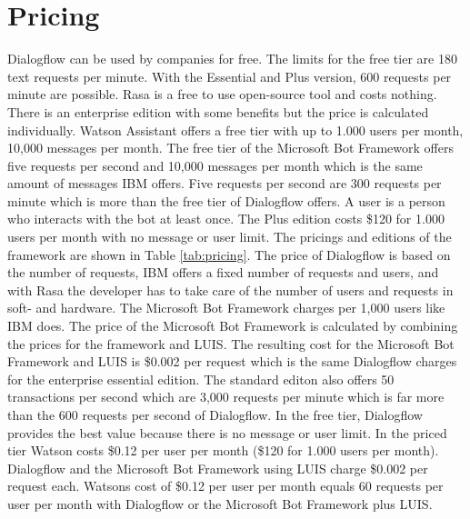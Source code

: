 \section*{Pricing} \label{sec:pricing}
Dialogflow can be used by companies for free.
The limits for the free tier are 180 text requests per minute.
With the Essential and Plus version, 600 requests per minute are possible.
Rasa is a free to use open-source tool and costs nothing.
There is an enterprise edition with some benefits but the price
is calculated individually.
Watson Assistant offers a free tier with up to 1.000 users per month, 
10,000 messages per month.
The free tier of the Microsoft Bot Framework offers five requests per second and 
10,000 messages per month which is the same amount of messages IBM offers.
Five requests per second are 300 requests per minute which is more than the 
free tier of Dialogflow offers.
A user is a person who interacts with the bot at least once.
The Plus edition costs \$120 for 1.000 users per month with
no message or user limit.
The pricings and editions of the framework are shown in Table \ref{tab:pricing}.
The price of Dialogflow is based on the number of requests,
IBM offers a fixed number of requests and users, and with Rasa the developer has
to take care of the number of users and requests in soft- and hardware.
The Microsoft Bot Framework charges per 1,000 users like IBM does.
The price of the Microsoft Bot Framework is calculated by combining the prices 
for the framework and LUIS.
The resulting cost for the Microsoft Bot Framework and LUIS is \$0.002 per request 
which is the same Dialogflow charges for the enterprise essential edition.  
The standard editon also offers 50 transactions per second which 
are 3,000 requests per minute which is far more than the 600 requests per second of 
Dialogflow.
In the free tier, Dialogflow provides the best value because there is no message or user limit.
In the priced tier Watson costs \$0.12 per user per month (\$120 for 1.000 users per month).
Dialogflow and the Microsoft Bot Framework using LUIS charge \$0.002 per request each.
Watsons cost of \$0.12 per user per month equals 60 requests per user per month with Dialogflow or 
the Microsoft Bot Framework plus LUIS.


